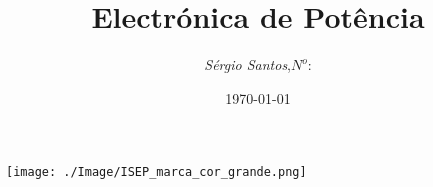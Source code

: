 \begin{titlepage}
\begin{minipage}{0.95\linewidth}
\centering
\texttt{[image: ./Image/ISEP\_marca\_cor\_grande.png]}
\label{Capa}
\title{Electr\'{o}nica de Pot\^{e}ncia}
\author{\emph{S\'{e}rgio Santos},\;$N^o$:}
\date{\today}
\maketitle
\end{minipage}
\end{titlepage}